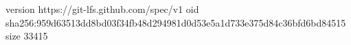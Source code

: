version https://git-lfs.github.com/spec/v1
oid sha256:959d63513dd8bd03f34fb48d294981d0d53e5a1d733e375d84c36bfd6bd84515
size 33415
